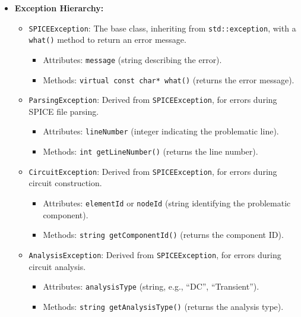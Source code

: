 \documentclass{article}
\begin{document}
\begin{itemize}
    \item \textbf{Exception Hierarchy:}
    \begin{itemize}
        \item \texttt{SPICEException}: The base class, inheriting from \texttt{std::exception}, with a \texttt{what()} method to return an error message.
        \begin{itemize}
            \item Attributes: \texttt{message} (string describing the error).
            \item Methods: \texttt{virtual const char* what()} (returns the error message).
        \end{itemize}
        \item \texttt{ParsingException}: Derived from \texttt{SPICEException}, for errors during SPICE file parsing.
        \begin{itemize}
            \item Attributes: \texttt{lineNumber} (integer indicating the problematic line).
            \item Methods: \texttt{int getLineNumber()} (returns the line number).
        \end{itemize}
        \item \texttt{CircuitException}: Derived from \texttt{SPICEException}, for errors during circuit construction.
        \begin{itemize}
            \item Attributes: \texttt{elementId} or \texttt{nodeId} (string identifying the problematic component).
            \item Methods: \texttt{string getComponentId()} (returns the component ID).
        \end{itemize}
        \item \texttt{AnalysisException}: Derived from \texttt{SPICEException}, for errors during circuit analysis.
        \begin{itemize}
            \item Attributes: \texttt{analysisType} (string, e.g., “DC”, “Transient”).
            \item Methods: \texttt{string getAnalysisType()} (returns the analysis type).
        \end{itemize}
    \end{itemize}


\end{itemize}
\end{document}
